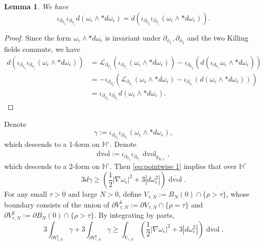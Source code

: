 \documentclass[a4paper,11pt]{amsart}
\newtheorem{lemma}[theorem]{Lemma}
\theoremstyle{definition}
\numberwithin{equation}{section}
\DeclareMathOperator{\dvol}{dvol}
\begin{document}
\begin{lemma}
    We have
    \begin{equation}
        \iota_{\partial_{\phi_2}}\iota_{\partial_{\phi_1}}d(\omega_{\epsilon}\wedge *d\omega_{\epsilon})=d(\iota_{\partial_{\phi_2}}\iota_{\partial_{\phi_1}}(\omega_{\epsilon}\wedge *d\omega_{\epsilon})).
    \end{equation}
\end{lemma}
\begin{proof}
    Since the form $\omega_\epsilon\wedge*d\omega_\epsilon$ is invariant under $\partial_{\phi_1},\partial_{\phi_2}$ and the two Killing fields commute, we have
    \begin{align*}
        d(\iota_{\partial_{\phi_2}}\iota_{\partial_{\phi_1}}(\omega_{\epsilon}\wedge *d\omega_{\epsilon}))&=\mathcal{L}_{\partial_{\phi_2}}(\iota_{\partial_{\phi_1}}(\omega_{\epsilon}\wedge *d\omega_{\epsilon}))-\iota_{\partial_{\phi_2}}(d(\iota_{\partial_{\phi_1}}\omega_{\epsilon}\wedge *d\omega_{\epsilon}))\\
        &=-\iota_{\partial_{\phi_2}}\left(\mathcal{L}_{\partial_{\phi_1}}(\omega_{\epsilon}\wedge *d\omega_{\epsilon})-\iota_{\partial_{\phi_1}}(d(\omega_{\epsilon}\wedge *d\omega_{\epsilon}))\right)\\
        &=\iota_{\partial_{\phi_2}}\iota_{\partial_{\phi_1}}d(\omega_{\epsilon}\wedge *d\omega_{\epsilon}).
    \end{align*}
\end{proof}

Denote $$\gamma:=\iota_{\partial_{\phi_2}}\iota_{\partial_{\phi_1}}(\omega_{\epsilon}\wedge *d\omega_{\epsilon}),$$ which descends to a 1-form on $\mathbb{H}^\circ$. Denote $$\overline{\mathrm{dvol}}:=\iota_{\partial_{\phi_2}}\iota_{\partial_{\phi_1}}\dvol_{g_{K,\epsilon}},$$ which descends to a 2-form on $\mathbb{H}^\circ$. Then  \eqref{eq:pointwise 1} implies that over $\mathbb{H}^\circ$
\begin{equation}\label{eq:pointwise 3}
    3d\gamma\geq(\frac{1}{2}|\nabla\omega_\epsilon|^2+3|d\omega_{\epsilon}^2|)\overline{\dvol}.
\end{equation}
For any small $\tau>0$ and large $N>0$, define $V_{\tau,N}:=B_{N}(0)\cap\{\rho>\tau\}$, whose boundary consists of the union of $\partial V_{\tau,N}^1:=\partial V_{\tau,N}\cap\{\rho=\tau\}$ and $\partial V_{\tau,N}^2:=\partial B_N(0)\cap\{\rho>\tau\}$. By integrating by parts,
$$3\int_{\partial V_{\tau,N}^1}\gamma+3\int_{\partial V_{\tau,N}^2}\gamma\geq \int_{V_{\tau,N}}(\frac{1}{2}|\nabla\omega_\epsilon|^2+3|d\omega_{\epsilon}^2|)\overline{\dvol}.$$
\end{document}
